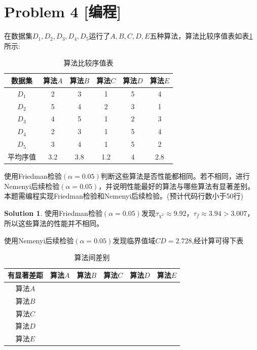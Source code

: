 \documentclass[a4paper,UTF8]{article}
\theoremstyle{definition}
\newtheorem*{solution}{Solution}
\begin{document}
\section*{Problem 4 [编程]} 
在数据集$D_1,D_2,D_3,D_4,D_5$运行了$A,B,C,D,E$五种算法，算法比较序值表如表\ref{table:ranking}所示:
\begin{table}[h]
\centering
\caption{算法比较序值表} \vspace{2mm}\label{table:ranking}
\begin{tabular}{c|c c c c c}\hline
数据集 & 算法$A$ & 算法$B$  & 算法$C$  &算法$D$  &算法$E$ \\
\hline
$D_1$ & 2  & 3 &  1 &  5  & 4\\
$D_2$ & 5  & 4 &  2 &  3  & 1\\
$D_3$ & 4  & 5 &  1 &  2  & 3\\
$D_4$ & 2  & 3 &  1 &  5  & 4\\
$D_5$ & 3  & 4 &  1 &  5  & 2\\
\hline
平均序值 & 3.2 &  3.8 & 1.2 &  4 &  2.8 \\
\hline
\end{tabular}
\end{table}

使用Friedman检验$(\alpha=0.05)$判断这些算法是否性能都相同。若不相同，进行Nemenyi后续检验$(\alpha=0.05)$，并说明性能最好的算法与哪些算法有显著差别。本题需编程实现Friedman检验和Nemenyi后续检验。(预计代码行数小于50行)
\begin{solution}
	\phantom{abc}
	
	使用Friedman检验$(\alpha=0.05)$发现$\tau_{\chi^2} \approx 9.92$，$\tau_f \approx 3.94 > 3.007$，所以这些算法的性能并不相同。
	
	使用Nemenyi后续检验$(\alpha=0.05)$发现临界值域$CD=2.728$,经计算可得下表
	\begin{table}[h]
		\centering
		\caption{算法间差别} \vspace{2mm}\label{table:ranking}
		\begin{tabular}{c|c |c| c| c| c}\hline
			有显著差距 & 算法$A$ & 算法$B$  & 算法$C$  &算法$D$  &算法$E$ \\
			\hline
			算法$A$ &   &  &   &    & \\
			\hline
			算法$B$ &   &  &  &    & \\
			\hline
			算法$C$ &   &  &   &  \checkmark  & \\
			\hline
			算法$D$ &   &  & \checkmark  &    & \\
			\hline
			算法$E$ &   &  &   &    & \\
			\hline
		\end{tabular}
	\end{table}
~\\
~\\
\end{solution}
\end{document}
